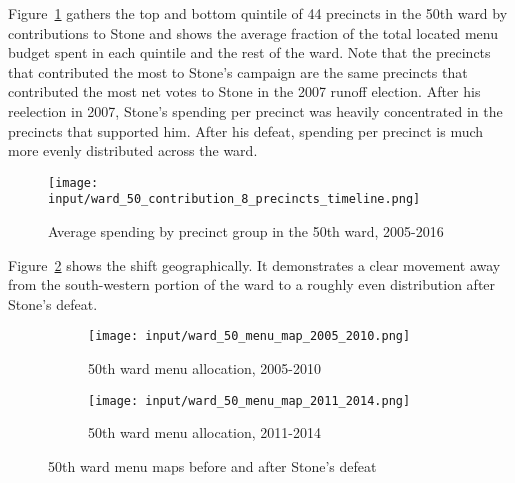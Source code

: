 Figure~\ref{fig:stone_spending_timeline} gathers the top and bottom quintile of 44 precincts in the 50th ward by contributions to Stone and shows the average fraction of the total located menu budget spent in each quintile and the rest of the ward.
Note that the precincts that contributed the most to Stone's campaign are the same precincts that contributed the most net votes to Stone in the 2007 runoff election.
After his reelection in 2007, Stone's spending per precinct was heavily concentrated in the precincts that supported him.
After his defeat, spending per precinct is much more evenly distributed across the ward.

\begin{figure}[H]
    \centering
    \texttt{[image: input/ward\_50\_contribution\_8\_precincts\_timeline.png]}
    \caption{Average spending by precinct group in the 50th ward, 2005-2016}
    \label{fig:stone_spending_timeline}
\end{figure}

Figure~\ref{fig:stone_spending_maps} shows the shift geographically. 
It demonstrates a clear movement away from the south-western portion of the ward to a roughly even distribution after Stone's defeat.

\begin{figure}[H]
    \centering
    \begin{subfigure}[b]{0.45\textwidth} %
    \texttt{[image: input/ward\_50\_menu\_map\_2005\_2010.png]}
    \caption{50th ward menu allocation, 2005-2010}
    \end{subfigure}
    \hfill %
    \begin{subfigure}[b]{0.45\textwidth}
    \texttt{[image: input/ward\_50\_menu\_map\_2011\_2014.png]}
    \caption{50th ward menu allocation, 2011-2014}
    \end{subfigure}
    \caption{50th ward menu maps before and after Stone's defeat}
    \label{fig:stone_spending_maps}
\end{figure}

